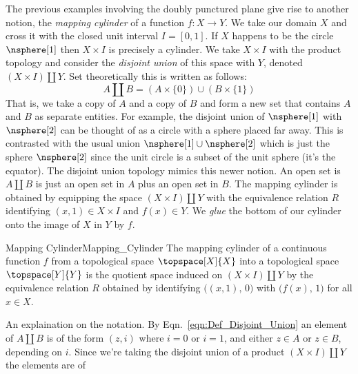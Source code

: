         The previous examples involving the doubly punctured plane give
        rise to another notion, the \textit{mapping cylinder} of a
        function $f:X\rightarrow{Y}$. We take our domain $X$ and cross
        it with the closed unit interval $I=[0,1]$. If $X$ happens to be
        the circle $\nsphere[1]$ then $X\times{I}$ is precisely a
        cylinder. We take $X\times{I}$ with the product topology and
        consider the \textit{disjoint union} of this space with $Y$,
        denoted $(X\times{I})\coprod{Y}$. Set theoretically this is
        written as follows:
        \begin{equation}
            \label{eqn:Def_Disjoint_Union}%
            A\coprod{B}=(A\times\{0\})\cup(B\times\{1\})
        \end{equation}
        That is, we take a copy of $A$ and a copy of $B$ and form a
        new set that contains $A$ and $B$ as separate entities. For
        example, the disjoint union of $\nsphere[1]$ with $\nsphere[2]$
        can be thought of as a circle with a sphere placed far away.
        This is contrasted with the usual union
        $\nsphere[1]\cup\nsphere[2]$ which is just the sphere
        $\nsphere[2]$ since the unit circle is a subset of the unit
        sphere (it's the equator). The disjoint union topology mimics
        this newer notion. An open set is $A\coprod{B}$ is just an open
        set in $A$ plus an open set in $B$. The mapping cylinder is
        obtained by equipping the space $(X\times{I})\coprod{Y}$ with
        the equivalence relation $R$ identifying $(x,1)\in{X}\times{I}$
        and $f(x)\in{Y}$. We \textit{glue} the bottom of our cylinder
        onto the image of $X$ in $Y$ by $f$.
        \begin{fdefinition}{Mapping Cylinder}{Mapping_Cylinder}
            The mapping cylinder of a continuous function $f$ from a
            topological space $\topspace[X]{X}$ into a topological space
            $\topspace[Y]{Y}$ is the quotient space induced on
            $(X\times{I})\coprod{Y}$ by the equivalence relation $R$
            obtained by identifying $\big((x,1),\,0\big)$ with
            $\big(f(x),\,1\big)$ for all $x\in{X}$.
        \end{fdefinition}
        An explaination on the notation. By
        Eqn.~\ref{eqn:Def_Disjoint_Union} an element of $A\coprod{B}$ is
        of the form $(z,i)$ where $i=0$ or $i=1$, and either $z\in{A}$
        or $z\in{B}$, depending on $i$. Since we're taking the disjoint
        union of a product $(X\times{I})\coprod{Y}$ the elements are of
